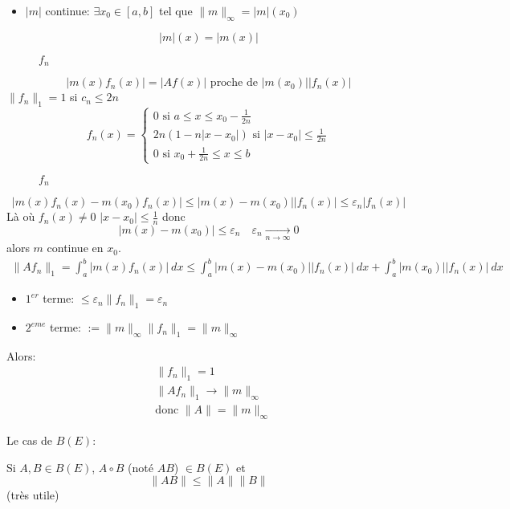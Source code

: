 \begin{preuve}
\begin{itemize}
         \item $|m|$ continue:  $\exists x_0 \in [a, b]$ tel que $\|m\|_{\infty} = |m|(x_0)$
    \end{itemize}
    \[
    |m|(x) = |m(x)|
    \] 
\begin{figure}[H]
    \centering
    \caption{$f_n$}
    \label{fig:preuve-prop-line-cont-borne}
\end{figure}
\[
|m(x)f_n(x)| = |Af(x)| \text{ proche de } |m(x_0)| |f_n(x)|
\] 
$\|f_n\|_{1} = 1$ si $c_n \le 2n$
\[
f_n(x) = \begin{cases}
    0 \text{ si } a \le x \le x_0 - \frac{1}{2n}\\
    2n(1 - n|x - x_0|) \text{ si } |x - x_0| \le \frac{1}{2n}\\
    0 \text{ si } x_0 + \frac{1}{2n} \le x \le b
\end{cases}
\] 
\begin{figure}[H]
    \centering
    \caption{$f_n$}
    \label{fig:preuve-lin-cont-bornee-2}
\end{figure}
\[
|m(x)f_n(x) - m(x_0)f_n(x)| \le |m(x) - m(x_0)| |f_n(x)| \le \varepsilon_n|f_n(x)|
\] 
Là où $f_n(x) \neq 0$ $|x - x_0| \le \frac{1}{n}$ donc 
\[
|m(x) - m(x_0)| \le \varepsilon_n \quad \varepsilon_n \xrightarrow[n \to \infty]{} 0
\] 
alors $m$ continue en  $x_0$.
 \begin{align*}
    \|Af_n\|_{1} = \int_{{a}}^{{b}} {|m(x)f_n(x)|} \: d{x} \le \int_{{a}}^{{b}} {|m(x) - m(x_0)| |f_n(x)|} \: d{x} + \int_{{a}}^{{b}} {|m(x_0)| |f_n(x)|} \: d{x} 
\end{align*}
\begin{itemize}
    \item $1^{er}$ terme: $\le \varepsilon_n\|f_n\|_{1} = \varepsilon_n$
    \item $2^{eme}$ terme: $:= \|m\|_{\infty}\|f_n\|_{1} = \|m\|_{\infty}$
\end{itemize}
Alors:
\begin{align*}
    &\|f_n\|_{1} = 1\\
    &\|Af_n\|_{1} \to \|m\|_{\infty}\\
    &\text{donc } \|A\| = \|m\|_{\infty}
\end{align*}
\end{preuve}
\begin{prop}
   Le cas de $B(E)$:
   \par
   Si $A, B \in B(E)$, $A \circ B$ (noté $AB$) $\in B(E)$ et 
   \[
   \|AB\| \le \|A\|\|B\|
   \] 
   (très utile)
\end{prop}
